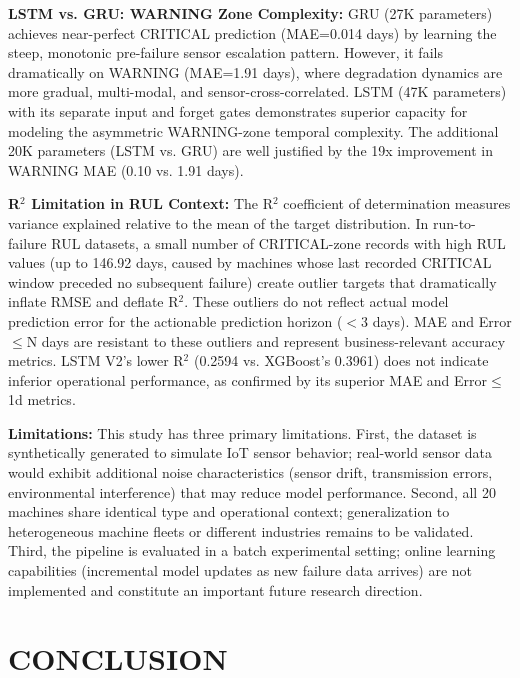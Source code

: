 \documentclass[conference]{IEEEtran}
\begin{document}
\textbf{LSTM vs. GRU: WARNING Zone Complexity:} GRU (27K parameters) achieves near-perfect CRITICAL prediction (MAE=0.014 days) by learning the steep, monotonic pre-failure sensor escalation pattern. However, it fails dramatically on WARNING (MAE=1.91 days), where degradation dynamics are more gradual, multi-modal, and sensor-cross-correlated. LSTM (47K parameters) with its separate input and forget gates demonstrates superior capacity for modeling the asymmetric WARNING-zone temporal complexity. The additional 20K parameters (LSTM vs. GRU) are well justified by the 19x improvement in WARNING MAE (0.10 vs. 1.91 days).

\textbf{R$^2$ Limitation in RUL Context:} The R$^2$ coefficient of determination measures variance explained relative to the mean of the target distribution. In run-to-failure RUL datasets, a small number of CRITICAL-zone records with high RUL values (up to 146.92 days, caused by machines whose last recorded CRITICAL window preceded no subsequent failure) create outlier targets that dramatically inflate RMSE and deflate R$^2$. These outliers do not reflect actual model prediction error for the actionable prediction horizon ($<$3 days). MAE and Error$\leq$N days are resistant to these outliers and represent business-relevant accuracy metrics. LSTM V2's lower R$^2$ (0.2594 vs. XGBoost's 0.3961) does not indicate inferior operational performance, as confirmed by its superior MAE and Error$\leq$1d metrics.

\textbf{Limitations:} This study has three primary limitations. First, the dataset is synthetically generated to simulate IoT sensor behavior; real-world sensor data would exhibit additional noise characteristics (sensor drift, transmission errors, environmental interference) that may reduce model performance. Second, all 20 machines share identical type and operational context; generalization to heterogeneous machine fleets or different industries remains to be validated. Third, the pipeline is evaluated in a batch experimental setting; online learning capabilities (incremental model updates as new failure data arrives) are not implemented and constitute an important future research direction.

\section{CONCLUSION}
\end{document}
